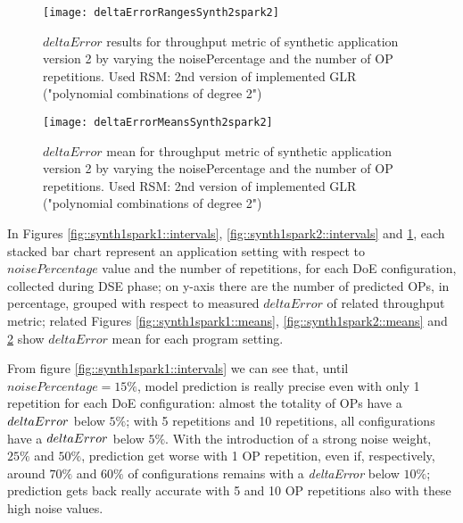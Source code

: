 \begin{figure}[h]

    \centering
    
    \texttt{[image: deltaErrorRangesSynth2spark2]}
    
     \caption{$deltaError$ results for throughput metric of synthetic application version 2 by varying the noisePercentage and the number of OP repetitions. Used RSM: 2nd version of implemented GLR ("polynomial combinations of degree 2")}
    
    \label{fig::synth2spark2::intervals}
    
\end{figure}

\begin{figure}[h]

    \centering
    
    \texttt{[image: deltaErrorMeansSynth2spark2]}
    
    \caption{$deltaError$ mean for throughput metric of synthetic application version 2 by varying the noisePercentage and the number of OP repetitions. Used RSM: 2nd version of implemented GLR ("polynomial combinations of degree 2")}
    
    \label{fig::synth2spark2::means}
    
\end{figure}





In Figures \ref{fig::synth1spark1::intervals}, \ref{fig::synth1spark2::intervals} and \ref{fig::synth2spark2::intervals}, each stacked bar chart represent an application setting with respect to $noisePercentage$ value and the number of repetitions, for each DoE configuration, collected during DSE phase; on y-axis there are the number of predicted OPs, in percentage, grouped with respect to measured $deltaError$ of related throughput metric; related Figures \ref{fig::synth1spark1::means}, \ref{fig::synth1spark2::means} and \ref{fig::synth2spark2::means} show $deltaError$ mean for each program setting.

From figure \ref{fig::synth1spark1::intervals} we can see that, until $noisePercentage = 15\%$, model prediction is really precise even with only 1 repetition for each DoE configuration: almost the totality of OPs have a $del\-ta\-Er\-ror$ below $5\%$; with 5 repetitions and 10 repetitions, all configurations have a $del\-ta\-Er\-ror$ below $5\%$. With the introduction of a strong noise weight, $25\%$ and $50\%$, prediction get worse with 1 OP repetition, even if, respectively, around $70\%$ and $60\%$ of configurations remains with a \textit{deltaError} below $10\%$; prediction gets back really accurate with 5 and 10 OP repetitions also with these high noise values.

